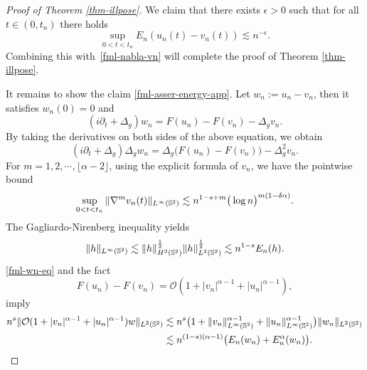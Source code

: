 \documentclass[11pt, reqno]{amsart}
\numberwithin{equation}{section}
\theoremstyle{definition}
\theoremstyle{remark}
\begin{document}
\begin{proof}[Proof of Theorem \ref{thm-illpose}]
We claim that there exists $\epsilon>0$ such that  for all $t\in(0,t_n)$ there holds
\begin{equation}\label{fml-asser-energy-app}
\sup_{0<t<t_n}E_n(u_n(t)-v_n(t)) \lesssim n^{-\epsilon}.
\end{equation} 
Combining this with~\eqref{fml-nabla-vn} will  complete the proof of Theorem \ref{thm-illpose}.
		
It remains to show the claim \eqref{fml-asser-energy-app}. Let $w_n := u_n - v_n$, then it satisfies $w_n(0)=0$ and 
\begin{equation}\label{fml-wn-eq}
(i\partial_t + \Delta_g)w_n = F(u_n)-F(v_n)-\Delta_g v_n.
\end{equation}
By taking the derivatives on both sides of the above equation, we obtain
\begin{equation}\label{fml-nab-wn-eq}
(i\partial_t + \Delta_g)\Delta_g w_n =\Delta_g \big(F(u_n)-F(v_n)\big)-\Delta_g^2 v_n.
\end{equation}
For $m=1,2,\cdots,\lfloor \alpha-2\rfloor$, using the explicit formula of $v_n$, we have the pointwise bound
\begin{equation}\label{fml-v-deri-Linf}
\sup_{0<t<t_n}\|\nabla^m v_n(t)\|_{L^\infty(\Bbb S^2)} \lesssim n^{1-s+m} \big(\log n\big)^{m(1-\delta \alpha)}.
\end{equation}
The Gagliardo-Nirenberg inequality yields
\begin{equation}\label{fml-GN-ineq}
\|h\|_{L^\infty(\Bbb S^2)} \lesssim \|h\|^{\frac{1}{2}}_{H^2(\Bbb S^2)} \|h\|^{\frac{1}{2}}_{L^2(\Bbb S^2)} \lesssim n^{1-s} E_n(h).
\end{equation}
\eqref{fml-wn-eq} and the fact  
\begin{equation*}
F(u_n)-F(v_n) = \mathcal{O}(1+|v_n|^{\alpha-1}+|u_n|^{\alpha-1}),
\end{equation*}
imply 
\begin{align}\nonumber
n^{s}\| \mathcal{O}(1+|v_n|^{\alpha-1}+|u_n|^{\alpha-1}) w\|_{L^2(\Bbb S^2)} &\lesssim n^{s} \big( 1 + \|v_n\|^{\alpha-1}_{L^\infty(\Bbb S^2)} + \|u_n\|^{\alpha-1}_{L^\infty(\Bbb S^2)} \big) \|w_n\|_{L^2(\Bbb S^2)}\\\label{fml-En-T1}
&\lesssim n^{(1-s)(\alpha-1)} \big( E_n(w_n) + E^\alpha_n(w_n) \big).
\end{align}
		

\end{proof}
\end{document}
